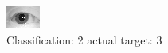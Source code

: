 \begin{figure}[h!]
\begin{center}
\includegraphics[width=0.60\columnwidth]{figures/ID1085_class_2_target_3.png}
\end{center}
\caption{ Classification: 2 actual target: 3}
\label{fig:ID1085_class_2_target_3}
\end{figure}
